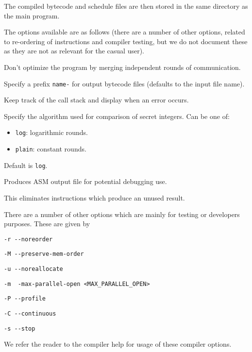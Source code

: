 
\noindent The compiled bytecode and schedule files are then stored in the 
same directory as the main program. 


\vspace{5mm}

\noindent
The options available are as follows (there are a number of other options, related to
re-ordering of instructions and compiler testing, but we do not document these as they
are not as relevant for the casual user).

Don't optimize the program by merging independent rounds of communication.

Specify a prefix \verb|name-| for output bytecode files (defaults to the input file name).

Keep track of the call stack and display when an error occurs.

Specify the algorithm used for comparison of secret integers. Can be one of:
\begin{itemize}
\item \verb|log|: logarithmic rounds.
\item \verb|plain|: constant rounds.
\end{itemize}
Default is \verb|log|. 

Produces ASM output file for potential debugging use.

This eliminates instructions which produce an unused result.

\vspace{5mm}
\noindent
There are a number of other options which are mainly for testing
or developers purposes. These are given by
\begin{description}
	\item \verb|-r --noreorder|
	\item \verb|-M --preserve-mem-order|
	\item \verb|-u --noreallocate|
	\item \verb|-m  -max-parallel-open <MAX_PARALLEL_OPEN>|
	\item \verb|-P --profile|
	\item \verb|-C --continuous|
	\item \verb|-s --stop|
\end{description}
We refer the reader to the compiler help for usage of these compiler options.

